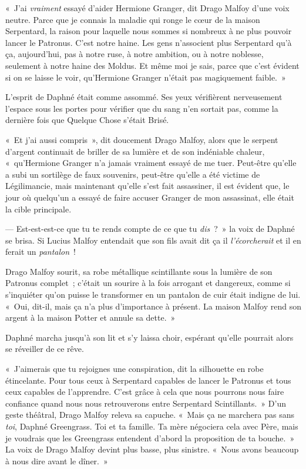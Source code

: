 «~J'ai \emph{vraiment} essayé d'aider Hermione Granger, dit Drago Malfoy d'une voix neutre.
Parce que je connais la maladie qui ronge le cœur de la maison Serpentard, la raison pour laquelle nous sommes si nombreux à ne plus pouvoir lancer le Patronus.
C'est notre haine.
Les gens n'associent plus Serpentard qu'à ça, aujourd'hui, pas à notre ruse, à notre ambition, ou à notre noblesse, seulement à notre haine des Moldus.
Et même moi je sais, parce que c'est évident si on se laisse le voir, qu'Hermione Granger n'était pas magiquement faible.~»

L'esprit de Daphné était comme assommé.
Ses yeux vérifièrent nerveusement l'espace sous les portes pour vérifier que du sang n'en sortait pas, comme la dernière fois que Quelque Chose s'était Brisé.

«~Et j'ai aussi compris~», dit doucement Drago Malfoy, alors que le serpent d'argent continuait de briller de sa lumière et de son indéniable chaleur, «~qu'Hermione Granger n'a jamais vraiment essayé de me tuer.
Peut-être qu'elle a subi un sortilège de faux souvenirs, peut-être qu'elle a été victime de Légilimancie, mais maintenant qu'elle s'est fait assassiner, il est évident que, le jour où quelqu'un a essayé de faire accuser Granger de mon assassinat, elle était la cible principale.

--- Est-est-est-ce que tu te rends compte de ce que tu \emph{dis}~?~»
la voix de Daphné se brisa.
Si Lucius Malfoy entendait que son fils avait dit ça il \emph{l'écorcherait} et il en ferait un \emph{pantalon}~!

Drago Malfoy sourit, sa robe métallique scintillante sous la lumière de son Patronus complet~; c'était un sourire à la fois arrogant et dangereux, comme si s'inquiéter qu'on puisse le transformer en un pantalon de cuir était indigne de lui.
«~Oui, dit-il, mais ça n'a plus d'importance à présent.
La maison Malfoy rend son argent à la maison Potter et annule sa dette.~»

Daphné marcha jusqu'à son lit et s'y laissa choir, espérant qu'elle pourrait alors se réveiller de ce rêve.

«~J'aimerais que tu rejoignes une conspiration, dit la silhouette en robe étincelante.
Pour tous ceux à Serpentard capables de lancer le Patronus et tous ceux capables de l'apprendre.
C'est grâce à cela que nous pourrons nous faire confiance quand nous nous retrouverons entre Serpentard Scintillants.~»
D'un geste théâtral, Drago Malfoy releva sa capuche.
«~Mais ça ne marchera pas sans \emph{toi}, Daphné Greengrass.
Toi et ta famille.
Ta mère négociera cela avec Père, mais je voudrais que les Greengrass entendent d'abord la proposition de ta bouche.~»
La voix de Drago Malfoy devint plus basse, plus sinistre.
«~Nous avons beaucoup à nous dire avant le dîner.~»


